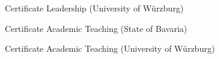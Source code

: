 
\begin{cventries}

	{Certificate Leadership (University of Würzburg)}{}%
	{}

	{Certificate Academic Teaching (State of Bavaria)}{}%
	{}

	{Certificate Academic Teaching  (University of Würzburg)}{}%
	{}

\end{cventries}
